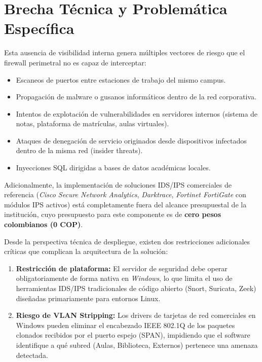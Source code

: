\documentclass[12pt, letterpaper, oneside]{report}
\begin{document}
\section{Brecha Técnica y Problemática Específica}

Esta ausencia de visibilidad interna genera múltiples vectores de riesgo que el firewall perimetral no es capaz de interceptar:

\begin{itemize}[leftmargin=*]
  \item Escaneos de puertos entre estaciones de trabajo del mismo campus.
  \item Propagación de malware o gusanos informáticos dentro de la red corporativa.
  \item Intentos de explotación de vulnerabilidades en servidores internos (sistema de notas, plataforma de matrículas, aulas virtuales).
  \item Ataques de denegación de servicio originados desde dispositivos infectados dentro de la misma red (insider threats).
  \item Inyecciones SQL dirigidas a bases de datos académicas locales.
\end{itemize}

Adicionalmente, la implementación de soluciones IDS/IPS comerciales de referencia (\textit{Cisco Secure Network Analytics}, \textit{Darktrace}, \textit{Fortinet FortiGate} con módulos IPS activos) está completamente fuera del alcance presupuestal de la institución, cuyo presupuesto para este componente es de \textbf{cero pesos colombianos (0 COP)}.

Desde la perspectiva técnica de despliegue, existen dos restricciones adicionales críticas que complican la arquitectura de la solución:

\begin{enumerate}[leftmargin=*]
  \item \textbf{Restricción de plataforma:} El servidor de seguridad debe operar obligatoriamente de forma nativa en \textit{Windows}, lo que limita el uso de herramientas IDS/IPS tradicionales de código abierto (Snort, Suricata, Zeek) diseñadas primariamente para entornos Linux.
  \item \textbf{Riesgo de VLAN Stripping:} Los drivers de tarjetas de red comerciales en Windows pueden eliminar el encabezado IEEE 802.1Q de los paquetes clonados recibidos por el puerto espejo (SPAN), impidiendo que el software identifique a qué subred (Aulas, Biblioteca, Externos) pertenece una amenaza detectada.
\end{enumerate}
\end{document}
